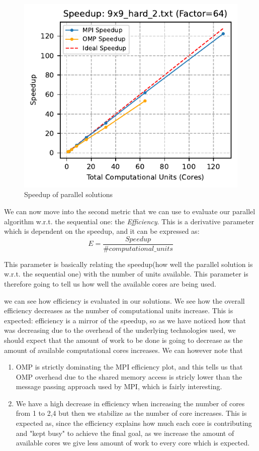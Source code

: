 \begin{figure}[htbp]
\centering
\includegraphics[width=0.9\linewidth]{imgs/speedup_mpi_omp_9x9_hard_2.pdf}
\caption{Speedup of parallel solutions}
\label{fig:speedup_9x9}
\end{figure}

We can now move into the second metric that we can use to evaluate our parallel algorithm w.r.t. the sequential one: the \textit{Efficiency}. This is a derivative parameter which is dependent on the speedup, and it can be expressed as:
\[
E = \frac{Speedup}{\# computational\_units}
\]

This parameter is basically relating the speedup(how well the parallel solution is w.r.t. the sequential one) with the number of units available. This parameter is therefore going to tell us how well the available cores are being used.

 we can see how efficiency is evaluated in our solutions. We see how the overall efficiency decreases as the number of computational units increase. This is expected: efficiency is a mirror of the speedup, so as we have noticed how that was decreasing due to the overhead of the underlying technologies used, we should expect that the amount of work to be done is going to decrease as the amount of available computational cores increases. We can however note that 
\begin{enumerate}
    \item OMP is strictly dominating the MPI efficiency plot, and this tells us that OMP overhead due to the shared memory access is stricly lower than the message passing approach used by MPI, which is fairly interesting. 
    \item We have a high decrease in efficiency when increasing the number of cores from 1 to 2,4 but then we stabilize as the number of core increases. This is expected as, since the efficiency explains how much each core is contributing and "kept busy" to achieve the final goal, as we increase the amount of available cores we give less amount of work to every core which is expected.
\end{enumerate}

